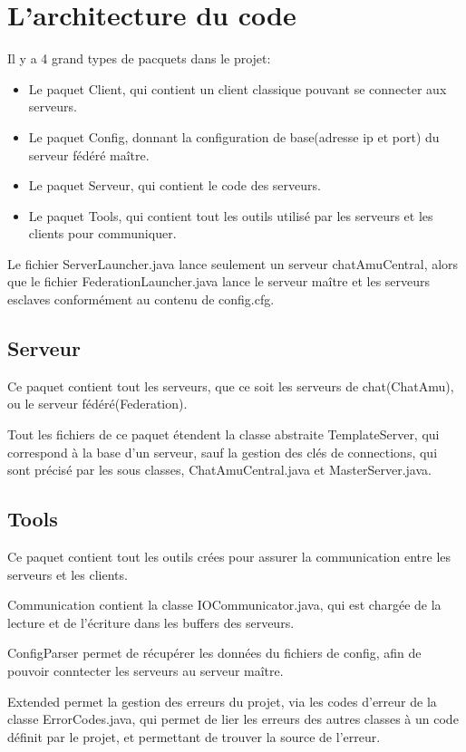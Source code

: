 \section{L'architecture du code}
Il y a 4 grand types de pacquets dans le projet:
\begin{itemize}
    \item Le paquet Client, qui contient un client classique pouvant se connecter aux serveurs.
    \item Le paquet Config, donnant la configuration de base(adresse ip et port) du serveur fédéré maître.
    \item Le paquet Serveur, qui contient le code des serveurs.
    \item Le paquet Tools, qui contient tout les outils utilisé par les serveurs et les clients pour communiquer.
\end{itemize}

Le fichier ServerLauncher.java lance seulement un serveur chatAmuCentral, alors que le fichier FederationLauncher.java lance le serveur maître et les serveurs esclaves conformément au contenu de config.cfg.

\subsection{Serveur}
Ce paquet contient tout les serveurs, que ce soit les serveurs de chat(ChatAmu), ou le serveur fédéré(Federation).

Tout les fichiers de ce paquet étendent la classe abstraite TemplateServer, qui correspond à la base d'un serveur, sauf la gestion des clés de connections, qui sont précisé par les sous classes, ChatAmuCentral.java et MasterServer.java.

\subsection{Tools}
Ce paquet contient tout les outils crées pour assurer la communication entre les serveurs et les clients.

Communication contient la classe IOCommunicator.java, qui est chargée de la lecture et de l'écriture dans les buffers des serveurs.

ConfigParser permet de récupérer les données du fichiers de config, afin de pouvoir conntecter les serveurs au serveur maître.

Extended permet la gestion des erreurs du projet, via les codes d'erreur de la classe ErrorCodes.java, qui permet de lier les erreurs des autres classes à un code définit par le projet, et permettant de trouver la source de l'erreur.

